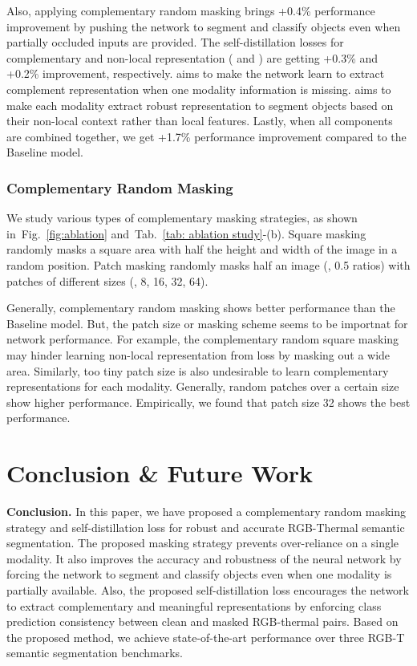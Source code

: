 \documentclass[10pt,twocolumn,letterpaper]{article}
\newcommand{\figref}[1]{Fig.~\ref{#1}}
\newcommand{\tabref}[1]{Tab.~\ref{#1}}
\begin{document}
Also, applying complementary random masking  brings +0.4\% performance improvement by pushing the network to segment and classify objects even when partially occluded inputs are provided.
The self-distillation losses for complementary and non-local representation ( and ) are getting +0.3\% and +0.2\% improvement, respectively.
 aims to make the network learn to extract complement representation when one modality information is missing.
 aims to make each modality extract robust representation to segment objects based on their non-local context rather than local features. 
Lastly, when all components are combined together, we get +1.7\% performance improvement compared to the Baseline model.

\subsubsection{Complementary Random Masking} 
We study various types of complementary masking strategies, as shown in~\figref{fig:ablation} and~\tabref{tab: ablation study}-(b).
Square masking randomly masks a square area with half the height and width of the image in a random position.
Patch masking randomly masks half an image (\ie, 0.5 ratios) with patches of different sizes (\eg, 8, 16, 32, 64).

Generally, complementary random masking shows better performance than the Baseline model. 
But, the patch size or masking scheme seems to be importnat for network performance.
For example, the complementary random square masking may hinder learning non-local representation from  loss by masking out a wide area.
Similarly, too tiny patch size is also undesirable to learn complementary representations for each modality.
Generally, random patches over a certain size show higher performance. 
Empirically, we found that patch size 32 shows the best performance. 
 \section{Conclusion \& Future Work}
\textbf{Conclusion.} In this paper, we have proposed a complementary random masking strategy and self-distillation loss for robust and accurate RGB-Thermal semantic segmentation.
The proposed masking strategy prevents over-reliance on a single modality. 
It also improves the accuracy and robustness of the neural network by forcing the network to segment and classify objects even when one modality is partially available.
Also, the proposed self-distillation loss encourages the network to extract complementary and meaningful representations by enforcing class prediction consistency between clean and masked RGB-thermal pairs.
Based on the proposed method, we achieve state-of-the-art performance over three RGB-T semantic segmentation benchmarks.
\end{document}

